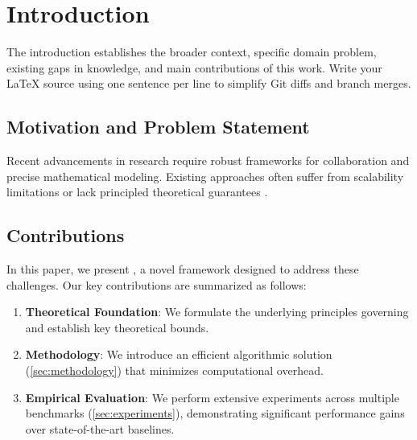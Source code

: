 \section{Introduction}
\label{sec:introduction}

The introduction establishes the broader context, specific domain problem, existing gaps in knowledge, and main contributions of this work.
Write your LaTeX source using one sentence per line to simplify Git diffs and branch merges.


\subsection{Motivation and Problem Statement}
\label{sec:motivation}
Recent advancements in research require robust frameworks for collaboration and precise mathematical modeling.
Existing approaches often suffer from scalability limitations or lack principled theoretical guarantees \cite{vaswani2017attention, goodfellow2016deep}.

\subsection{Contributions}
\label{sec:contributions}
In this paper, we present \sister{}, a novel framework designed to address these challenges.
Our key contributions are summarized as follows:
\begin{enumerate}
    \item \textbf{Theoretical Foundation}: We formulate the underlying principles governing \sister{} and establish key theoretical bounds.
    \item \textbf{Methodology}: We introduce an efficient algorithmic solution (\cref{sec:methodology}) that minimizes computational overhead.
    \item \textbf{Empirical Evaluation}: We perform extensive experiments across multiple benchmarks (\cref{sec:experiments}), demonstrating significant performance gains over state-of-the-art baselines.
\end{enumerate}
